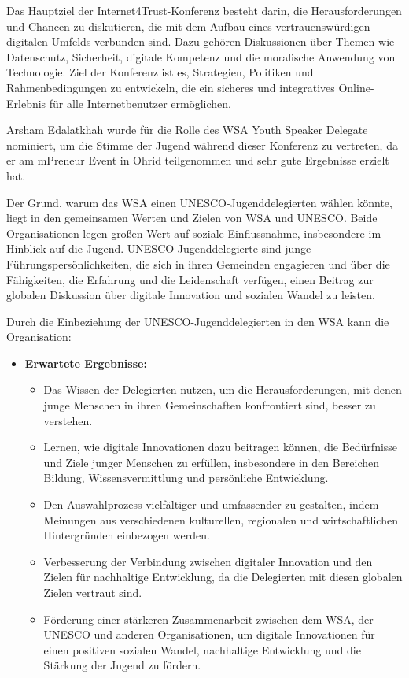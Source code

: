 Das Hauptziel der Internet4Trust-Konferenz besteht darin, die Herausforderungen und Chancen zu diskutieren, die mit dem Aufbau eines vertrauenswürdigen digitalen Umfelds verbunden sind. Dazu gehören Diskussionen über Themen wie Datenschutz, Sicherheit, digitale Kompetenz und die moralische Anwendung von Technologie. Ziel der Konferenz ist es, Strategien, Politiken und Rahmenbedingungen zu entwickeln, die ein sicheres und integratives Online-Erlebnis für alle Internetbenutzer ermöglichen.

Arsham Edalatkhah wurde für die Rolle des WSA Youth Speaker Delegate nominiert, um die Stimme der Jugend während dieser Konferenz zu vertreten, da er am mPreneur Event in Ohrid teilgenommen und sehr gute Ergebnisse erzielt hat.

Der Grund, warum das WSA einen UNESCO-Jugenddelegierten wählen könnte, liegt in den gemeinsamen Werten und Zielen von WSA und UNESCO. Beide Organisationen legen großen Wert auf soziale Einflussnahme, insbesondere im Hinblick auf die Jugend. UNESCO-Jugenddelegierte sind junge Führungspersönlichkeiten, die sich in ihren Gemeinden engagieren und über die Fähigkeiten, die Erfahrung und die Leidenschaft verfügen, einen Beitrag zur globalen Diskussion über digitale Innovation und sozialen Wandel zu leisten.

Durch die Einbeziehung der UNESCO-Jugenddelegierten in den WSA kann die Organisation:

\begin{itemize}
    \item \textbf{Erwartete Ergebnisse:}
          \begin{itemize}
              \item {Das Wissen der Delegierten nutzen, um die Herausforderungen, mit denen junge Menschen in ihren Gemeinschaften konfrontiert sind, besser zu verstehen.}
              \item {Lernen, wie digitale Innovationen dazu beitragen können, die Bedürfnisse und Ziele junger Menschen zu erfüllen, insbesondere in den Bereichen Bildung, Wissensvermittlung und persönliche Entwicklung.}
              \item {Den Auswahlprozess vielfältiger und umfassender zu gestalten, indem Meinungen aus verschiedenen kulturellen, regionalen und wirtschaftlichen Hintergründen einbezogen werden.}
              \item {Verbesserung der Verbindung zwischen digitaler Innovation und den Zielen für nachhaltige Entwicklung, da die Delegierten mit diesen globalen Zielen vertraut sind.}
              \item {Förderung einer stärkeren Zusammenarbeit zwischen dem WSA, der UNESCO und anderen Organisationen, um digitale Innovationen für einen positiven sozialen Wandel, nachhaltige Entwicklung und die Stärkung der Jugend zu fördern.}
          \end{itemize}
\end{itemize}


